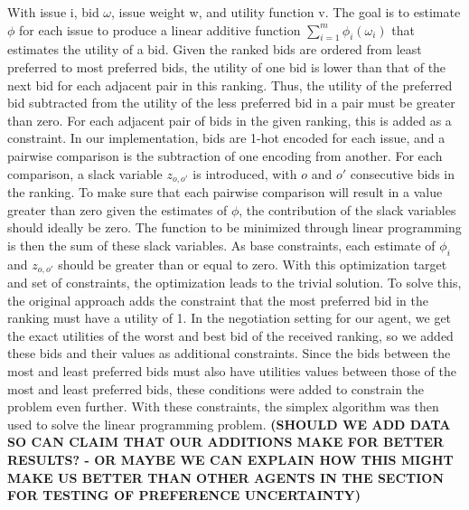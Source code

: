 \documentclass[a4paper,11pt]{article}
\theoremstyle{mytheor}
\begin{document}
With issue i, bid $\omega$, issue weight w, and utility function v. The goal is to estimate $\phi$ for each issue to produce a linear additive function $\sum_{i=1}^{m}\phi_i(\omega_i)$ that estimates the utility of a bid. Given the ranked bids are ordered from least preferred to most preferred bids, the utility of one bid is lower than that of the next bid for each adjacent pair in this ranking. Thus, the utility of the preferred bid subtracted from the utility of the less preferred bid in a pair must be greater than zero. For each adjacent pair of bids in the given ranking, this is added as a constraint. In our implementation, bids are 1-hot encoded for each issue, and a pairwise comparison is the subtraction of one encoding from another. For each comparison, a slack variable $z_{o,o'}$ is introduced, with $o$ and $o'$ consecutive bids in the ranking. To make sure that each pairwise comparison will result in a value greater than zero given the estimates of $\phi$, the contribution of the slack variables should ideally be zero. The function to be minimized through linear programming is then the sum of these slack variables. As base constraints, each estimate of $\phi_i$ and $z_{o,o'}$ should be greater than or equal to zero. With this optimization target and set of constraints, the optimization leads to the trivial solution. To solve this, the original approach adds the constraint that the most preferred bid in the ranking must have a utility of 1. In the negotiation setting for our agent, we get the exact utilities of the worst and best bid of the received ranking, so we added these bids and their values as additional constraints. Since the bids between the most and least preferred bids must also have utilities values between those of the most and least preferred bids, these conditions were added to constrain the problem even further. With these constraints, the simplex algorithm was then used to solve the linear programming problem. \textbf{(SHOULD WE ADD DATA SO CAN CLAIM THAT OUR ADDITIONS MAKE FOR BETTER RESULTS? - OR MAYBE WE CAN EXPLAIN HOW THIS MIGHT MAKE US BETTER THAN OTHER AGENTS IN THE SECTION FOR TESTING OF PREFERENCE UNCERTAINTY)}
\end{document}
